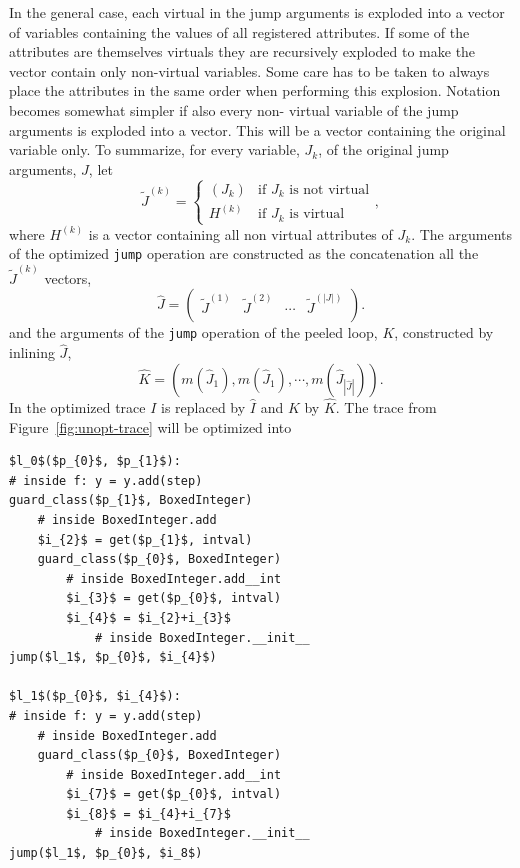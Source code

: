 \documentclass[preprint]{sigplanconf}
\begin{document}
In the general case, each virtual in the jump arguments is exploded into a
vector of variables containing the values of all registered attributes. If some
of the attributes are themselves virtuals they are recursively exploded
to make the vector contain only non-virtual variables. Some care has
to be taken to always place the attributes in the same order when
performing this explosion. Notation becomes somewhat simpler if also every non-
virtual variable of the jump arguments is exploded into a vector. This will
be a vector containing the original variable only. To summarize, for
every variable, $J_k$, of the original jump arguments, $J$, let
\begin{equation}
  \tilde J^{\left(k\right)} = \left\{
      \begin{array}{ll}
        \left(J_k\right)  & \text{if $J_k$ is not virtual} \\
        H^{\left(k\right)} & \text{if $J_k$ is virtual}
      \end{array}
  \right.
  ,
\end{equation}
where $H^{\left(k\right)}$ is a vector containing all non virtual
attributes of $J_k$. The arguments of the optimized \lstinline{jump}
operation are constructed as the concatenation all the $\tilde J^{\left(k\right)}$ vectors,
\begin{equation}
  \hat J = \left( 
    \begin{array}{cccc}
      \tilde J^{\left(1\right)} & \tilde J^{\left(2\right)} & \cdots &
      \tilde J^{\left(|J|\right)} \\
    \end{array}
  \right)      
  .
\end{equation}
and the arguments of the \lstinline{jump} operation of the peeled loop,
$K$, constructed by inlining $\hat J$,
\begin{equation}
  \hat K = \left(m\left(\hat J_1\right), m\left(\hat J_1\right), 
                 \cdots, m\left(\hat J_{|\hat J|}\right)\right)
  .
\end{equation}
In the optimized trace $I$ is replaced by $\hat I$ and $K$ by $\hat
K$. The trace from Figure~\ref{fig:unopt-trace} will be optimized into

\begin{lstlisting}[mathescape,numbers = right,basicstyle=\setstretch{1.05}\ttfamily\scriptsize]
$l_0$($p_{0}$, $p_{1}$):
# inside f: y = y.add(step)
guard_class($p_{1}$, BoxedInteger)
    # inside BoxedInteger.add
    $i_{2}$ = get($p_{1}$, intval)
    guard_class($p_{0}$, BoxedInteger)
        # inside BoxedInteger.add__int
        $i_{3}$ = get($p_{0}$, intval)
        $i_{4}$ = $i_{2}+i_{3}$
            # inside BoxedInteger.__init__
jump($l_1$, $p_{0}$, $i_{4}$)

$l_1$($p_{0}$, $i_{4}$):
# inside f: y = y.add(step)
    # inside BoxedInteger.add
    guard_class($p_{0}$, BoxedInteger)
        # inside BoxedInteger.add__int
        $i_{7}$ = get($p_{0}$, intval)
        $i_{8}$ = $i_{4}+i_{7}$
            # inside BoxedInteger.__init__
jump($l_1$, $p_{0}$, $i_8$)
\end{lstlisting}
\end{document}
